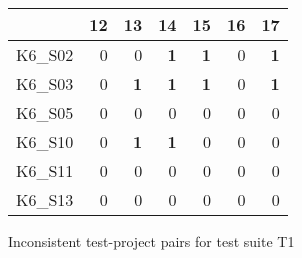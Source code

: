 \begin{figure}[htpb]
    \centering

    \begin{subfigure}{.4\textwidth}
        \centering

        \setlength{\tabcolsep}{0.2em}
        \tiny
        \begin{tabular}{l|rrrrrr}
            \toprule
                    & 12         & 13         & 14         & 15         & 16         & 17         \\
            \midrule
            K6\_S02 & 0          & 0          & \textbf{1} & \textbf{1} & 0          & \textbf{1} \\
            K6\_S03 & 0          & \textbf{1} & \textbf{1} & \textbf{1} & 0          & \textbf{1} \\
            K6\_S05 & 0          & 0          & 0          & 0          & 0          & 0          \\
            K6\_S10 & 0          & \textbf{1} & \textbf{1} & 0          & 0          & 0          \\
            K6\_S11 & 0          & 0          & 0          & 0          & 0          & 0          \\
            K6\_S13 & 0          & 0          & 0          & 0          & 0          & 0          \\
            \bottomrule
        \end{tabular}
        \caption{Inconsistent test-project pairs for test suite T1}
        \label{tab:inconsistency_matrix_excerpt_normal}
        \setlength{\tabcolsep}{\defaulttabcolsep}
    \end{subfigure}
    \vspace{.08\textwidth}
    \begin{subfigure}{.4\textwidth}
        \centering


\end{subfigure}
\end{figure}
